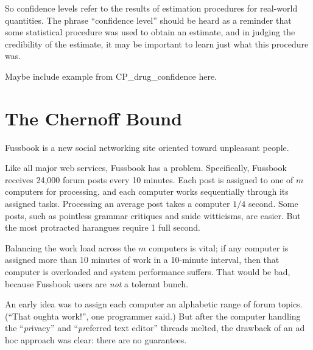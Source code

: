 So confidence levels refer to the results of estimation procedures for
real-world quantities.  The phrase ``confidence level'' should be heard as
a reminder that some statistical procedure was used to obtain an estimate,
and in judging the credibility of the estimate, it may be important to
learn just what this procedure was.

\begin{editingnotes}
Maybe include example from CP\_drug\_confidence here.
\end{editingnotes}

\begin{problems}
\practiceproblems
{}

\classproblems
{}

\examproblems
{}
\end{problems}

\section{The Chernoff Bound}

Fussbook is a new social networking site oriented toward unpleasant
people.

Like all major web services, Fussbook has a  problem.
Specifically, Fussbook receives 24,000 forum posts every 10 minutes.
Each post is assigned to one of $m$ computers for processing, and each
computer works sequentially through its assigned tasks.  Processing an
average post takes a computer $1/4$ second.  Some posts, such as
pointless grammar critiques and snide witticisms, are easier.  But the
most protracted harangues require 1 full second.

Balancing the work load across the $m$ computers is vital; if any
computer is assigned more than 10 minutes of work in a 10-minute
interval, then that computer is overloaded and system performance
suffers.  That would be bad, because Fussbook users are \emph{not} a
tolerant bunch.

An early idea was to assign each computer an alphabetic range of forum
topics.  (``That oughta work!'', one programmer said.)  But after the
computer handling the ``\emph{pr}ivacy'' and ``\emph{pr}eferred text
editor'' threads melted, the drawback of an ad hoc approach was clear:
there are no guarantees.

